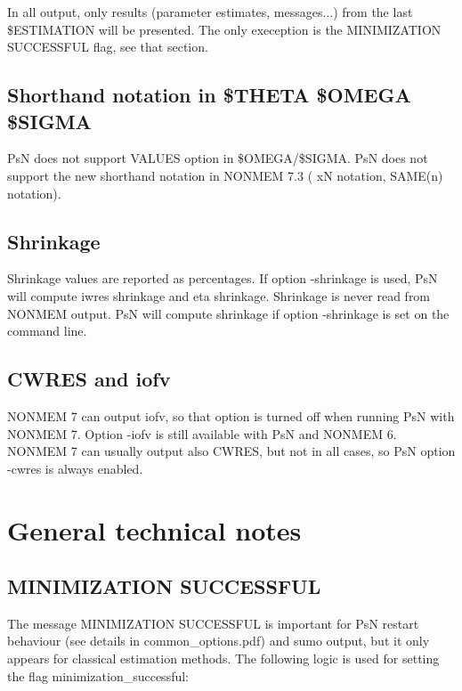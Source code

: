	In all output, only results (parameter estimates, messages...) from the last \$ESTIMATION will be presented. The only exeception is the MINIMIZATION SUCCESSFUL flag, see that section.
	
	\subsection{Shorthand notation in \$THETA \$OMEGA \$SIGMA}
	PsN does not support VALUES option in \$OMEGA/\$SIGMA. 
	PsN does not support the new shorthand notation in NONMEM 7.3 ( xN notation, SAME(n) notation).
	
	\subsection{Shrinkage}
	
	Shrinkage values are reported as percentages. If option -shrinkage is used, PsN will compute iwres shrinkage and eta shrinkage. 
	Shrinkage is never read from NONMEM output. PsN will compute shrinkage if option -shrinkage is set on the command line.
	
	\subsection{CWRES and iofv}
	
	NONMEM 7 can output iofv, so that option is turned off when running PsN with NONMEM 7. Option -iofv is still available with PsN and NONMEM 6.
	NONMEM 7 can usually output also CWRES, but not in all cases,
	so PsN option -cwres is always enabled.
	
	
	
	
	\section{General technical notes}
	
	\subsection{MINIMIZATION SUCCESSFUL}
	
	The message MINIMIZATION SUCCESSFUL is important for PsN restart behaviour (see details in common\_options.pdf) and sumo output, but it only appears for classical estimation methods. The following logic is used for setting the flag minimization\_successful:
	
